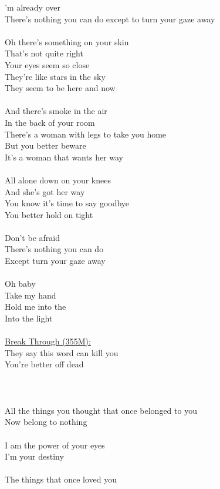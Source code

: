 \documentclass[11pt]{article}
\begin{document}
'm already over\\
There's nothing you can do except to turn your gaze away\\
\\
Oh there's something on your skin\\
That's not quite right\\
Your eyes seem so close\\
They're like stars in the sky\\
They seem to be here and now\\
\\
And there's smoke in the air\\
In the back of your room\\
There's a woman with legs to take you home\\
But you better beware\\
It's a woman that wants her way\\
\\
All alone down on your knees\\
And she's got her way\\
You know it's time to say goodbye\\
You better hold on tight\\
\\
Don't be afraid\\
There's nothing you can do\\
Except turn your gaze away\\
\\
Oh baby\\
Take my hand\\
Hold me into the\\
Into the light\\
\\
\underline{Break Through (355M):}\\
They say this word can kill you\\
You're better off dead\\
\\
[Chorus]\\
\\
All the things you thought that once belonged to you\\
Now belong to nothing\\
\\
I am the power of your eyes\\
I'm your destiny\\
\\
The things that once loved you\\
\end{document}
